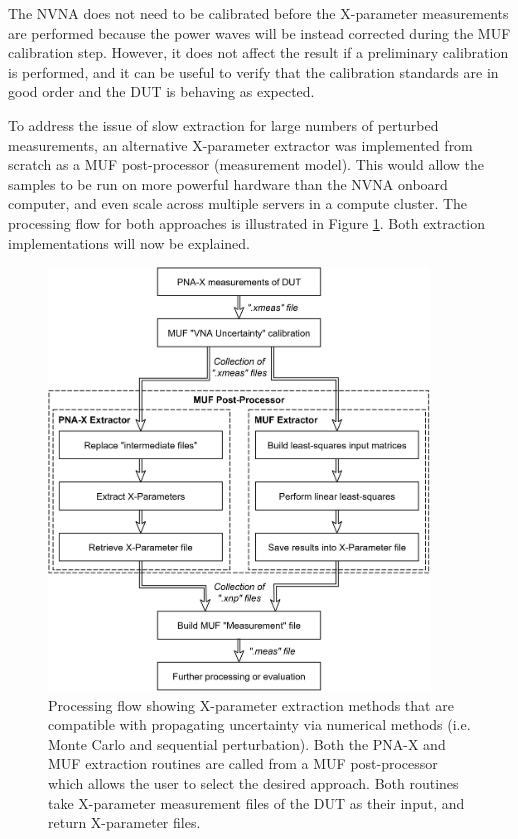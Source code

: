 \documentclass[../thesis/thesis.tex]{subfiles}
\begin{document}
The NVNA does not need to be calibrated before the X-parameter measurements are performed because the power waves will be instead corrected during the MUF calibration step. However, it does not affect the result if a preliminary calibration is performed, and it can be useful to verify that the calibration standards are in good order and the DUT is behaving as expected.

To address the issue of slow extraction for large numbers of perturbed measurements, an alternative  X-parameter extractor was implemented from scratch as a MUF post-processor (measurement model). This would allow the samples to be run on more powerful hardware than the NVNA onboard computer, and even scale across multiple servers in a compute cluster. The processing flow for both approaches is illustrated in Figure \ref{ch5_fig_uncproc}. Both extraction implementations will now be explained.

\begin{figure}
	\centering
	\includegraphics[width=0.9\textwidth]{uncproc}
	\caption[X-parameter uncertainty processing flow.]{Processing flow showing X-parameter extraction methods that are compatible with propagating uncertainty via numerical methods (i.e. Monte Carlo and sequential perturbation). Both the PNA-X and MUF extraction routines are called from a MUF post-processor which allows the user to select the desired approach. Both routines take X-parameter measurement files of the DUT as their input, and return X-parameter files.}
	\label{ch5_fig_uncproc}
\end{figure}
\end{document}
